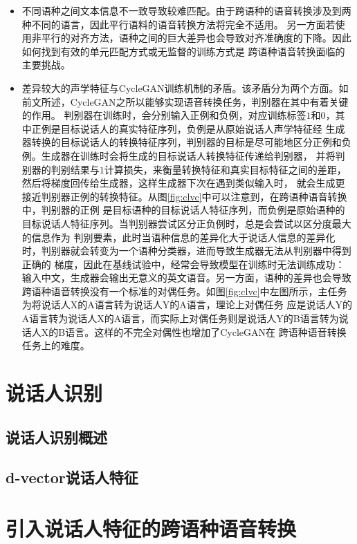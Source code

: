 \begin{itemize}
    \item 不同语种之间文本信息不一致导致较难匹配。由于跨语种的语音转换涉及到两种不同的语言，因此平行语料的语音转换方法将完全不适用。
    另一方面若使用非平行的对齐方法，语种之间的巨大差异也会导致对齐准确度的下降。因此如何找到有效的单元匹配方式或无监督的训练方式是
    跨语种语音转换面临的主要挑战。
    \item 差异较大的声学特征与CycleGAN训练机制的矛盾。该矛盾分为两个方面。如前文所述，CycleGAN之所以能够实现语音转换任务，判别器在其中有着关键的作用。
    判别器在训练时，会分别输入正例和负例，对应训练标签$1$和$0$，其中正例是目标说话人的真实特征序列，负例是从原始说话人声学特征经
    生成器转换的目标说话人的转换特征序列，判别器的目标是尽可能地区分正例和负例。生成器在训练时会将生成的目标说话人转换特征传递给判别器，
    并将判别器的判别结果与$1$计算损失，来衡量转换特征和真实目标特征之间的差距，然后将梯度回传给生成器，这样生成器下次在遇到类似输入时，
    就会生成更接近判别器正例的转换特征。从图\ref{fig:clvc}中可以注意到，在跨语种语音转换中，判别器的正例
    是目标语种的目标说话人特征序列，而负例是原始语种的目标说话人特征序列。当判别器尝试区分正负例时，总是会尝试以区分度最大的信息作为
    判别要素，此时当语种信息的差异化大于说话人信息的差异化时，判别器就会转变为一个语种分类器，进而导致生成器无法从判别器中得到正确的
    梯度，因此在基线试验中，经常会导致模型在训练时无法训练成功：输入中文，生成器会输出无意义的英文语音。另一方面，语种的差异也会导致
    跨语种语音转换没有一个标准的对偶任务。如图\ref{fig:clvc}中左图所示，主任务为将说话人X的A语言转为说话人Y的A语言，理论上对偶任务
    应是说话人Y的A语言转为说话人X的A语言，而实际上对偶任务则是说话人Y的B语言转为说话人X的B语言。这样的不完全对偶性也增加了CycleGAN在
    跨语种语音转换任务上的难度。
\end{itemize}


\section{说话人识别}
\subsection{说话人识别概述}
\subsection{d-vector说话人特征}

\section{引入说话人特征的跨语种语音转换}
